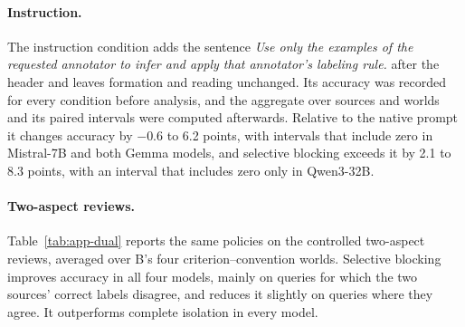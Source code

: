 \begin{table}[t]
\centering\small
{}
\caption{Complete isolation and A-only reading on SST-5 with shared label words.}
\label{tab:app-pol-other}
\end{table}

\begin{table}[t]
\centering\small
{}
\caption{Separate label words on SST-5 (\%). Other source's words: share of queries answered with one of the other source's label words.}
\label{tab:app-sep}
\end{table}

\paragraph{Instruction.}
The instruction condition adds the sentence \textit{Use only the examples of the requested annotator to infer and apply that annotator's labeling rule.} after the header and leaves formation and reading unchanged.
Its accuracy was recorded for every condition before analysis, and the aggregate over sources and worlds and its paired intervals were computed afterwards.
Relative to the native prompt it changes accuracy by $-0.6$ to 6.2 points, with intervals that include zero in Mistral-7B and both Gemma models, and selective blocking exceeds it by 2.1 to 8.3 points, with an interval that includes zero only in Qwen3-32B.

\paragraph{Two-aspect reviews.}
Table~\ref{tab:app-dual} reports the same policies on the controlled two-aspect reviews, averaged over B's four criterion--convention worlds.
Selective blocking improves accuracy in all four models, mainly on queries for which the two sources' correct labels disagree, and reduces it slightly on queries where they agree.
It outperforms complete isolation in every model.

